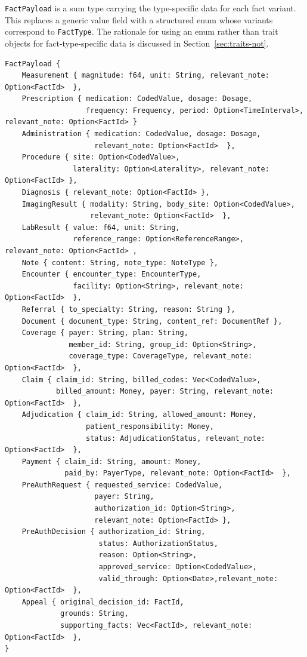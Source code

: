 \documentclass[11pt]{article}
\begin{document}
\texttt{FactPayload} is a sum type carrying the type-specific data for each
fact variant. This replaces a generic value field with a structured enum
whose variants correspond to \texttt{FactType}. The rationale for using an
enum rather than trait objects for fact-type-specific data is discussed in
Section~\ref{sec:traits-not}.

\begin{lstlisting}
FactPayload {
    Measurement { magnitude: f64, unit: String, relevant_note: Option<FactId>  },
    Prescription { medication: CodedValue, dosage: Dosage,
                   frequency: Frequency, period: Option<TimeInterval>, relevant_note: Option<FactId> }
    Administration { medication: CodedValue, dosage: Dosage,
                     relevant_note: Option<FactId>  },
    Procedure { site: Option<CodedValue>,
                laterality: Option<Laterality>, relevant_note: Option<FactId> },
    Diagnosis { relevant_note: Option<FactId> },
    ImagingResult { modality: String, body_site: Option<CodedValue>,
                    relevant_note: Option<FactId>  },
    LabResult { value: f64, unit: String,
                reference_range: Option<ReferenceRange>, relevant_note: Option<FactId> ,
    Note { content: String, note_type: NoteType },
    Encounter { encounter_type: EncounterType,
                facility: Option<String>, relevant_note: Option<FactId>  },
    Referral { to_specialty: String, reason: String },
    Document { document_type: String, content_ref: DocumentRef },
    Coverage { payer: String, plan: String,
               member_id: String, group_id: Option<String>,
               coverage_type: CoverageType, relevant_note: Option<FactId>  },
    Claim { claim_id: String, billed_codes: Vec<CodedValue>,
            billed_amount: Money, payer: String, relevant_note: Option<FactId>  },
    Adjudication { claim_id: String, allowed_amount: Money,
                   patient_responsibility: Money,
                   status: AdjudicationStatus, relevant_note: Option<FactId>  },
    Payment { claim_id: String, amount: Money,
              paid_by: PayerType, relevant_note: Option<FactId>  },
    PreAuthRequest { requested_service: CodedValue,
                     payer: String,
                     authorization_id: Option<String>,
                     relevant_note: Option<FactId> },
    PreAuthDecision { authorization_id: String,
                      status: AuthorizationStatus,
                      reason: Option<String>,
                      approved_service: Option<CodedValue>,
                      valid_through: Option<Date>,relevant_note: Option<FactId>  },
    Appeal { original_decision_id: FactId,
             grounds: String,
             supporting_facts: Vec<FactId>, relevant_note: Option<FactId>  },
}
\end{lstlisting}
\end{document}
